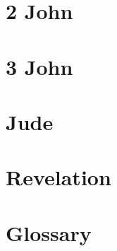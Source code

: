 \chapter{2 John}
\begin{multicols}{2}
  \raggedcolumns
  \parskip=0pt \relax
  
\end{multicols}

\chapter{3 John}
\begin{multicols}{2}
  \raggedcolumns
  \parskip=0pt \relax
  
\end{multicols}

\chapter{Jude}
\begin{multicols}{2}
  \raggedcolumns
  \parskip=0pt \relax
  
\end{multicols}

\chapter{Revelation}
\begin{multicols}{2}
  \raggedcolumns
  \parskip=0pt \relax
  
\end{multicols}

\chapter{Glossary}


\newpage





















